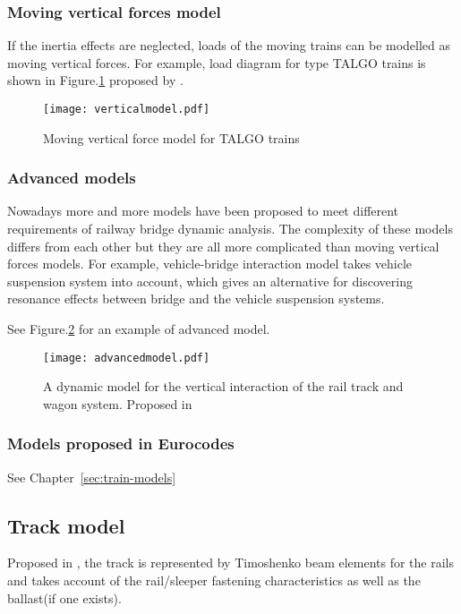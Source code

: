\subsubsection{Moving vertical forces model}
If the inertia effects are neglected, loads of the moving trains can be modelled as moving vertical forces. For example, load diagram for type TALGO trains is shown in Figure.\ref{fig:verticalmodel} proposed by \cite{uic}.

\begin{figure}[h]
	\centering
	\texttt{[image: verticalmodel.pdf]}
	\caption{Moving vertical force model for TALGO trains}
	\label{fig:verticalmodel}
\end{figure}

\subsubsection{Advanced models}
Nowadays more and more models have been proposed to meet different requirements of railway bridge dynamic analysis. The complexity of these models differs from each other but they are all more complicated than moving vertical forces models. For example, vehicle-bridge interaction model takes vehicle suspension system into account, which gives an alternative for discovering resonance effects between bridge and the vehicle suspension systems. 

See Figure.\ref{fig:advancedmodel} for an example of advanced model.

\begin{figure}[p]
	\centering
	\texttt{[image: advancedmodel.pdf]}
	\caption{A dynamic model for the vertical interaction of the rail track and wagon system. Proposed in \cite{sun2002dynamic}}
	\label{fig:advancedmodel}
\end{figure}


\subsubsection{Models proposed in Eurocodes}

See Chapter~\ref{sec:train-models}

\subsection{Track model}
Proposed in \cite[A.6.1.3]{uic}, the track is represented by Timoshenko beam elements for the rails and takes account of the rail/sleeper fastening characteristics as well as the ballast(if one exists).

